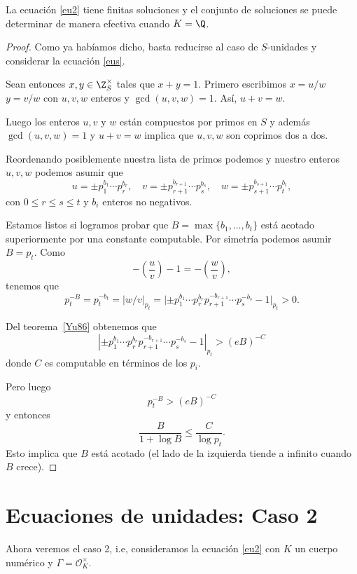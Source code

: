 \documentclass[11pt, reqno]{amsart}
\begin{document}
\begin{thm}
	La ecuación \eqref{eu2} tiene finitas soluciones y el conjunto de soluciones se puede determinar de manera efectiva cuando $K=\Q$.
\end{thm}
\begin{proof}
	Como ya habíamos dicho, basta reducirse al caso de $S$-unidades y considerar la ecuación \eqref{eus}.

	Sean entonces $x,y\in \Z_S^{\times}$ tales que $x+y=1$. Primero escribimos $x=u/w$ $y=v/w$ con $u,v,w$ enteros y $\gcd(u,v,w)=1$. Así, $u+v=w$.

	Luego los enteros $u,v$ y $w$ están compuestos por primos en $S$ y además $\gcd(u,v,w)=1$ y $u+v=w$ implica que $u,v,w$ son coprimos dos a dos.

	Reordenando posiblemente nuestra lista de primos podemos y nuestro enteros $u,v,w$ podemos asumir que $$u=\pm p_1^{b_1}\cdots p_r^{b_r},\quad v=\pm p_{r+1}^{b_{r+1}}\cdots p_s^{b_s},\quad w=\pm p_{s+1}^{b_{s+1}}\cdots p_t^{b_t},$$ con $0\leq r\leq s\leq t$ y $b_i$ enteros no negativos.

	Estamos listos si logramos probar que $B=\max\{b_1,\ldots,b_t\}$ está acotado superiormente por una constante computable.
	Por simetría podemos asumir $B=p_t$. Como
	\[
		-\left( \frac{u}{v} \right)-1=-\left( \frac{w}{v} \right),
	\]
	tenemos que
	\[
		p_t^{-B}=p_t^{-b_t}=|w/v|_{p_t}=\lvert\pm p_1^{b_1}\cdots p_r^{b_r}p_{r+1}^{-b_{r+1}}\cdots p_s^{-b_s}-1\rvert_{p_t}>0.
	\]

	Del teorema~\ref{Yu86} obtenemos que $$|\pm p_1^{b_1}\cdots p_r^{b_r}p_{r+1}^{-b_{r+1}}\cdots p_s^{-b_s}-1|_{p_t}>(eB)^{-C}$$ donde $C$ es computable en términos de los $p_i$.

	Pero luego $$p_t^{-B}>(eB)^{-C}$$ y entonces $$\frac{B}{1+\log B}\leq \frac{C}{\log p_t}.$$
	Esto implica que $B$ está acotado (el lado de la izquierda tiende a infinito cuando $B$ crece).
\end{proof}

\section{Ecuaciones de unidades: Caso 2}
Ahora veremos el caso 2, i.e, consideramos la ecuación \eqref{eu2} con $K$ un cuerpo numérico y $\Gamma=\mathcal{O}_K^{\times}$.

\end{document}
